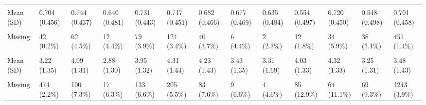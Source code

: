 \documentclass[
  single column]{article}
\begin{document}
\begin{landscape}
\begin{longtable}[t]{lllllllllllll}
\cellcolor{gray!10}{Partnership Status (Yes/No)} & \cellcolor{gray!10}{} & \cellcolor{gray!10}{} & \cellcolor{gray!10}{} & \cellcolor{gray!10}{} & \cellcolor{gray!10}{} & \cellcolor{gray!10}{} & \cellcolor{gray!10}{} & \cellcolor{gray!10}{} & \cellcolor{gray!10}{} & \cellcolor{gray!10}{} & \cellcolor{gray!10}{} & \cellcolor{gray!10}{}\\
Mean (SD) & 0.704 (0.456) & 0.744 (0.437) & 0.640 (0.481) & 0.731 (0.443) & 0.717 (0.451) & 0.682 (0.466) & 0.677 (0.469) & 0.635 (0.484) & 0.554 (0.497) & 0.720 (0.450) & 0.548 (0.498) & 0.701 (0.458)\\
\addlinespace
\cellcolor{gray!10}{Median [Min, Max]} & \cellcolor{gray!10}{1.00 [0, 1.00]} & \cellcolor{gray!10}{1.00 [0, 1.00]} & \cellcolor{gray!10}{1.00 [0, 1.00]} & \cellcolor{gray!10}{1.00 [0, 1.00]} & \cellcolor{gray!10}{1.00 [0, 1.00]} & \cellcolor{gray!10}{1.00 [0, 1.00]} & \cellcolor{gray!10}{1.00 [0, 1.00]} & \cellcolor{gray!10}{1.00 [0, 1.00]} & \cellcolor{gray!10}{1.00 [0, 1.00]} & \cellcolor{gray!10}{1.00 [0, 1.00]} & \cellcolor{gray!10}{1.00 [0, 1.00]} & \cellcolor{gray!10}{1.00 [0, 1.00]}\\
Missing & 42 (0.2\%) & 62 (4.5\%) & 12 (4.4\%) & 79 (3.9\%) & 124 (3.4\%) & 40 (3.7\%) & 6 (4.4\%) & 2 (2.3\%) & 12 (1.8\%) & 34 (5.9\%) & 38 (5.1\%) & 451 (1.4\%)\\
\cellcolor{gray!10}{Political Conservatism Level} & \cellcolor{gray!10}{} & \cellcolor{gray!10}{} & \cellcolor{gray!10}{} & \cellcolor{gray!10}{} & \cellcolor{gray!10}{} & \cellcolor{gray!10}{} & \cellcolor{gray!10}{} & \cellcolor{gray!10}{} & \cellcolor{gray!10}{} & \cellcolor{gray!10}{} & \cellcolor{gray!10}{} & \cellcolor{gray!10}{}\\
Mean (SD) & 3.22 (1.35) & 4.09 (1.31) & 2.88 (1.30) & 3.95 (1.32) & 4.31 (1.44) & 4.23 (1.43) & 3.43 (1.35) & 3.31 (1.69) & 4.03 (1.33) & 4.32 (1.33) & 3.25 (1.31) & 3.48 (1.43)\\
\cellcolor{gray!10}{Median [Min, Max]} & \cellcolor{gray!10}{3.00 [1.00, 7.00]} & \cellcolor{gray!10}{4.00 [1.00, 7.00]} & \cellcolor{gray!10}{3.00 [1.00, 7.00]} & \cellcolor{gray!10}{4.00 [1.00, 7.00]} & \cellcolor{gray!10}{4.00 [1.00, 7.00]} & \cellcolor{gray!10}{4.00 [1.00, 7.00]} & \cellcolor{gray!10}{3.00 [1.00, 7.00]} & \cellcolor{gray!10}{3.00 [1.00, 7.00]} & \cellcolor{gray!10}{4.00 [1.00, 7.00]} & \cellcolor{gray!10}{4.00 [1.00, 7.00]} & \cellcolor{gray!10}{3.00 [1.00, 7.00]} & \cellcolor{gray!10}{4.00 [1.00, 7.00]}\\
\addlinespace
Missing & 474 (2.2\%) & 100 (7.3\%) & 17 (6.3\%) & 133 (6.6\%) & 205 (5.5\%) & 83 (7.6\%) & 9 (6.6\%) & 4 (4.6\%) & 85 (12.9\%) & 64 (11.1\%) & 69 (9.3\%) & 1243 (3.9\%)\\

\end{longtable}
\end{landscape}
\end{document}
